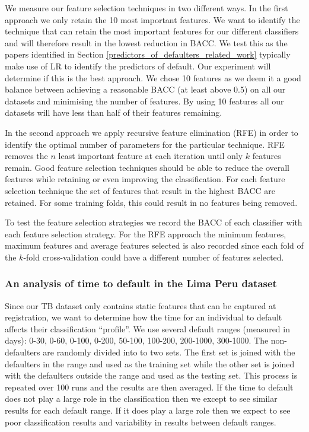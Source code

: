 \documentclass{sig-alternate-05-2015}
\begin{document}
	We measure our feature selection techniques in two different ways. In the first approach we only retain the 10 most important features.  We want to identify the technique that can retain the most important features for our different classifiers and will therefore result in the lowest reduction in BACC. We test this as the papers identified in Section \ref{predictors_of_defaulters_related_work} typically make use of LR to identify the predictors of default. Our experiment will determine if this is the best approach. We chose 10 features as we deem it a good balance between achieving a reasonable BACC (at least above 0.5) on all our datasets and minimising the number of features. By using 10 features all our datasets will have less than half of their features remaining.
	
	In the second approach we apply recursive feature elimination (RFE) in order to identify the optimal number of parameters for the particular technique. RFE removes the $n$ least important feature at each iteration until only $k$ features remain. Good feature selection techniques should be able to reduce the overall features while retaining or even improving the classification. For each feature selection technique the set of features that result in the highest BACC are retained. For some training folds, this could result in no features being removed. 
	
	To test the feature selection strategies we record the BACC of each classifier with each feature selection strategy. For the RFE approach the minimum features, maximum features and average features selected is also recorded since each fold of the $k$-fold cross-validation could have a different number of features selected.
	
	\subsubsection{An analysis of time to default in the Lima Peru dataset}
	Since our TB dataset only contains static features that can be captured at registration, we want to determine how the time for an individual to default affects their classification ``profile''. We use several default ranges (measured in days): 0-30, 0-60, 0-100, 0-200, 50-100, 100-200, 200-1000, 300-1000. The non-defaulters are randomly divided into to two sets. The first set is joined with the defaulters in the range and used as the training set while the other set is joined with the defaulters outside the range and used as the testing set. This process is repeated over 100 runs and the results are then averaged. If the time to default does not play a large role in the classification then we except to see similar results for each default range. If it does play a large role then we expect to see poor classification results and variability in results between default ranges.
	
\end{document}
